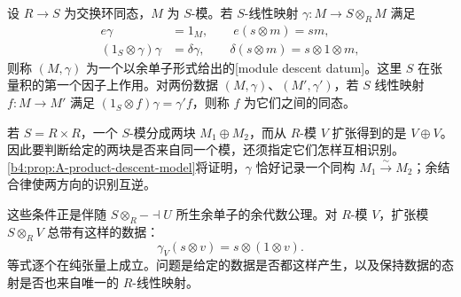 \begin{definition}\label{b4:def:A-faithfully-flat-descent-data}
	设 \(R\to S\) 为交换环同态，\(M\) 为 \(S\)-模。若 \(S\)-线性映射 \(\gamma:M\to S\otimes_RM\) 满足
	\begin{equation}\label{b4:eq:A-module-descent-data}
		\begin{aligned}
			e\gamma&=1_M,\qquad e(s\otimes m)=sm,\\
			(1_S\otimes\gamma)\gamma&=\delta\gamma,\qquad \delta(s\otimes m)=s\otimes1\otimes m,
		\end{aligned}
	\end{equation}
	则称 \((M,\gamma)\) 为一个以余单子形式给出的[module descent datum]。这里 \(S\) 在张量积的第一个因子上作用。对两份数据 \((M,\gamma)\)、\((M',\gamma')\)，若 \(S\) 线性映射 \(f:M\to M'\) 满足 \((1_S\otimes f)\gamma=\gamma'f\)，则称 \(f\) 为它们之间的同态。
\end{definition}

若 \(S=R\times R\)，一个 \(S\)-模分成两块 \(M_1\oplus M_2\)，而从 \(R\)-模 \(V\) 扩张得到的是 \(V\oplus V\)。因此要判断给定的两块是否来自同一个模，还须指定它们怎样互相识别。\cref{b4:prop:A-product-descent-model}将证明，\(\gamma\) 恰好记录一个同构 \(M_1\xrightarrow{\sim}M_2\)；余结合律使两方向的识别互逆。

\ProseParagraphBreak

这些条件正是伴随 \(S\otimes_R-\dashv U\) 所生余单子的余代数公理。对 \(R\)-模 \(V\)，扩张模 \(S\otimes_RV\) 总带有这样的数据：
\[
	\gamma_V(s\otimes v)=s\otimes(1\otimes v).
\]
等式逐个在纯张量上成立。问题是给定的数据是否都这样产生，以及保持数据的态射是否也来自唯一的 \(R\)-线性映射。

